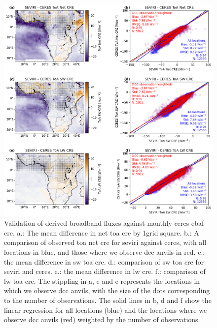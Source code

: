 \begin{figure}[tp]
    \includegraphics[width=\textwidth]{figures/ch3_03.png}
    \caption[
    Validation of derived broadband fluxes against monthly \acrshort{ceres}-\acrshort{ebaf} \acrshort{cre}
    ]{
    Validation of derived broadband fluxes against monthly \acrshort{ceres}-\acrshort{ebaf} \acrshort{cre}. a.: The mean difference in net \acrshort{toa} \acrshort{cre} by 1\textdegree grid square. b.: A comparison of observed \acrshort{toa} net \acrshort{cre} for \acrshort{seviri} against \acrshort{ceres}, with all locations in blue, and those where we observe \acrshort{dcc} anvils in red. c.: the mean difference in \acrshort{sw} \acrshort{toa} \acrshort{cre}. d.: comparison of \acrshort{sw} \acrshort{toa} \acrshort{cre} for \acrshort{seviri} and \acrshort{ceres}. e.: the mean difference in \acrshort{lw} \acrshort{cre}. f.: comparison of \acrshort{lw} \acrshort{toa} \acrshort{cre}. The stippling in a, c and e represents the locations in which we observe \acrshort{dcc} anvils, with the size of the dots corresponding to the number of observations. The solid lines in b, d and f show the linear regression for all locations (blue) and the locations where we observe \acrshort{dcc} anvils (red) weighted by the number of observations.
    }
    \label{fig:flux_validation}
\end{figure}

